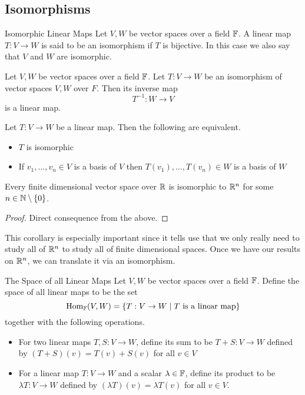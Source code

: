 \documentclass[a4paper]{article}
\begin{document}
\subsection{Isomorphisms}
\begin{defn}{Isomorphic Linear Maps}{} Let $V,W$ be vector spaces over a field $\mathbb{F}$. A linear map $T:V\to W$ is said to be an isomorphism if $T$ is bijective. In this case we also say that $V$ and $W$ are isomorphic. 
\end{defn}

\begin{thm}{}{} Let $V,W$ be vector spaces over a field $\mathbb{F}$. Let $T:V\to W$ be an isomorphism of vector spaces $V,W$ over $F$. Then its inverse map $$T^{-1}:W\to V$$ is a linear map. 
\end{thm}

\begin{thm}{}{} Let $T:V\to W$ be a linear map. Then the following are equivalent. 
\begin{itemize}
\item $T$ is isomorphic
\item If $v_1,\dots,v_n\in V$ is a basis of $V$ then $T(v_1),\dots,T(v_n)\in W$ is a basis of $W$
\end{itemize}
\end{thm}

\begin{crl}{}{} Every finite dimensional vector space over $\mathbb{R}$ is isomorphic to $\mathbb{R}^n$ for some $n\in\mathbb{N}\setminus\{0\}$. \tcbline
\begin{proof} Direct consequence from the above. 
\end{proof}
\end{crl}

This corollary is especially important since it tells use that we only really need to study all of $\mathbb{R}^n$ to study all of finite dimensional spaces. Once we have our results on $\mathbb{R}^n$, we can translate it via an isomorphism. 

\begin{defn}{The Space of all Linear Maps}{} Let $V,W$ be vector spaces over a field $\mathbb{F}$. Define the space of all linear maps to be the set $$\operatorname{Hom}_{\mathbb{F}}(V,W)=\{T:V\to W\;|\;T\text{ is a linear map}\}$$ together with the following operations. 
\begin{itemize}
\item For two linear maps $T,S:V\to W$, define its sum to be $T+S:V\to W$ defined by $(T+S)(v)=T(v)+S(v)$ for all $v\in V$
\item For a linear map $T:V\to W$ and a scalar $\lambda\in\mathbb{F}$, define its product to be $\lambda T:V\to W$ defined by $(\lambda T)(v)=\lambda T(v)$ for all $v\in V$. 
\end{itemize}
\end{defn}
\end{document}
